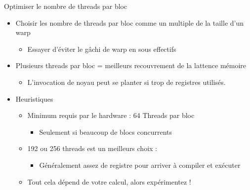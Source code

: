 \documentclass[handout,francais]{beamer}
\begin{document}
\begin{frame}{Optimiser le nombre de threads par bloc}

  \begin{itemize}
  \item Choisir les nombre de threads par bloc comme un multiple de la taille d'un warp
    \begin{itemize}
    \item Essayer d'éviter le gâchi de warp en sous effectifs
    \end{itemize}
  \item Plusieurs threads par bloc = meilleurs recouvrement de la lattence mémoire
    \begin{itemize}
    \item L'invocation de noyau peut se planter si trop de registres utilisés.
    \end{itemize}
  \item Heuristiques
    \begin{itemize}
    \item Minimum requis par le hardware : 64 Threads par bloc
      \begin{itemize}
      \item Seulement si beaucoup de blocs concurrents
      \end{itemize}
    \item 192 ou 256 threads est un meilleurs choix  : 
      \begin{itemize}
      \item Généralement assez de registre pour arriver à compiler et exécuter
      \end{itemize}
    \item Tout cela dépend de votre calcul, alors expérimentez !
    \end{itemize}
  \end{itemize}
\end{frame}
\end{document}
